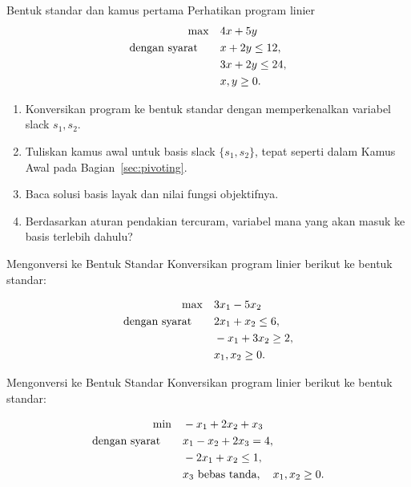 \begin{ex}{Bentuk standar dan kamus pertama}{}
\label{ex:standard-form-warmup-dictionary}
 Perhatikan program linier
\[
\begin{aligned}
\max \quad & 4x + 5y \\
\mbox{dengan syarat}\quad \quad
& x + 2y \leq 12, \\
& 3x + 2y \leq 24, \\
& x, y \geq 0.
\end{aligned}
\]
\begin{enumerate}
    \item Konversikan program ke bentuk standar dengan memperkenalkan variabel slack $s_1, s_2$.
    \item Tuliskan kamus awal untuk basis slack $\{s_1, s_2\}$, tepat seperti dalam Kamus Awal pada Bagian~\ref{sec:pivoting}.
    \item Baca solusi basis layak dan nilai fungsi objektifnya.
    \item Berdasarkan aturan pendakian tercuram, variabel mana yang akan masuk ke basis terlebih dahulu?
\end{enumerate}
\end{ex}

\begin{ex}{Mengonversi ke Bentuk Standar}{}
\label{ex:standard-form-1}
 Konversikan program linier berikut ke bentuk standar:

\[
\begin{aligned}
    \max \quad & 3x_1 - 5x_2 \\
    \mbox{dengan syarat}\quad \quad
    & 2x_1 + x_2 \leq 6, \\
    & -x_1 + 3x_2 \geq 2, \\
    & x_1, x_2 \geq 0.
\end{aligned}
\]
\end{ex}

\begin{ex}{Mengonversi ke Bentuk Standar}{}
\label{ex:standard-form-2}
 Konversikan program linier berikut ke bentuk standar:

\[
\begin{aligned}
    \min \quad & -x_1 + 2x_2 + x_3 \\
    \mbox{dengan syarat}\quad \quad
    & x_1 - x_2 + 2x_3 = 4, \\
    & -2x_1 + x_2 \leq 1, \\
    & x_3 \mbox{ bebas tanda}, \quad x_1, x_2 \geq 0.
\end{aligned}
\]
\end{ex}

